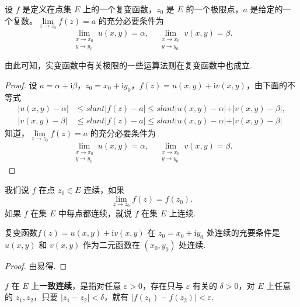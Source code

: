 \documentclass[../../main.tex]{subfiles}
\begin{document}
\begin{theorem}\label{theorem:复变函数极限存在充要条件1.7}
设 $f$ 是定义在点集 $E$ 上的一个复变函数，$z_0$ 是 $E$ 的一个极限点，$a$ 是给定的一个复数。$\lim\limits_{z \to z_0} f(z) = a$ 的充分必要条件为
\[
\lim_{\substack{x \to x_0 \\ y \to y_0}} u(x, y) = \alpha, \quad \lim_{\substack{x \to x_0 \\ y \to y_0}} v(x, y) = \beta.
\]
\end{theorem}
\begin{note}
由此可知，实变函数中有关极限的一些运算法则在复变函数中也成立.
\end{note}
\begin{proof}
设 $a = \alpha + \mathrm{i}\beta$，$z_0 = x_0 + \mathrm{i}y_0$，$f(z) = u(x, y) + \mathrm{i}v(x, y)$，由下面的不等式
\begin{align*}
\vert u(x, y) - \alpha \vert &\leqslant slant \vert f(z) - a \vert \leqslant slant \vert u(x, y) - \alpha \vert + \vert v(x, y) - \beta \vert, \\
\vert v(x, y) - \beta \vert &\leqslant slant \vert f(z) - a \vert \leqslant slant \vert u(x, y) - \alpha \vert + \vert v(x, y) - \beta \vert 
\end{align*}
知道，$\lim\limits_{z \to z_0} f(z) = a$ 的充分必要条件为
\[
\lim_{\substack{x \to x_0 \\ y \to y_0}} u(x, y) = \alpha, \quad \lim_{\substack{x \to x_0 \\ y \to y_0}} v(x, y) = \beta.
\]
\end{proof}

\begin{definition}
我们说 $f$ 在点 $z_0 \in E$ 连续，如果
\[
\lim_{z \to z_0} f(z) = f(z_0).
\]
如果 $f$ 在集 $E$ 中每点都连续，就说 $f$ 在集 $E$ 上连续.
\end{definition}

\begin{theorem}
复变函数$f(z) = u(x, y) + \mathrm{i}v(x, y)$ 在 $z_0 = x_0 + \mathrm{i}y_0$ 处连续的充要条件是 $u(x, y)$ 和 $v(x, y)$ 作为二元函数在 $(x_0, y_0)$ 处连续.
\end{theorem}
\begin{proof}
由易得.
\end{proof}

\begin{definition}
$f$ 在 $E$ 上\textbf{一致连续}，是指对任意 $\varepsilon > 0$，存在只与 $\varepsilon$ 有关的 $\delta > 0$，对 $E$ 上任意的 $z_1, z_2$，只要 $|z_1 - z_2| < \delta$，就有 $|f(z_1) - f(z_2)| < \varepsilon$.
\end{definition}
\end{document}
